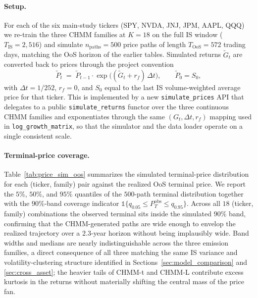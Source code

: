 \paragraph{Setup.}
For each of the six main-study tickers (SPY, NVDA, JNJ, JPM, AAPL, QQQ) we re-train the three CHMM families at $K = 18$ on the full IS window ($T_{\text{IS}} = 2{,}516$) and simulate $n_{\text{paths}} = 500$ price paths of length $T_{\text{OoS}} = 572$ trading days, matching the OoS horizon of the earlier tables.
Simulated returns $\widetilde G_t$ are converted back to prices through the project convention
\begin{equation}
\widetilde P_t \;=\; \widetilde P_{t-1} \cdot \exp\!\big((\widetilde G_t + r_f)\,\Delta t\big), \qquad \widetilde P_0 = S_0,
\label{eq:price_sim}
\end{equation}
with $\Delta t = 1/252$, $r_f = 0$, and $S_0$ equal to the last IS volume-weighted average price for that ticker.
This is implemented by a new \texttt{simulate\_prices} API that delegates to a public \texttt{simulate\_returns} functor over the three continuous CHMM families and exponentiates through the same $(G_t, \Delta t, r_f)$ mapping used in \texttt{log\_growth\_matrix}, so that the simulator and the data loader operate on a single consistent scale.

\paragraph{Terminal-price coverage.}
Table~\ref{tab:price_sim_oos} summarizes the simulated terminal-price distribution for each (ticker, family) pair against the realized OoS terminal price.
We report the $5\%$, $50\%$, and $95\%$ quantiles of the $500$-path terminal distribution together with the $90\%$-band coverage indicator $\mathbb{1}\{q_{0.05} \le P^{\text{obs}}_T \le q_{0.95}\}$.
Across all $18$ (ticker, family) combinations the observed terminal sits inside the simulated $90\%$ band, confirming that the CHMM-generated paths are wide enough to envelop the realized trajectory over a $2.3$-year horizon without being implausibly wide.
Band widths and medians are nearly indistinguishable across the three emission families, a direct consequence of all three matching the same IS variance and volatility-clustering structure identified in Sections~\ref{sec:model_comparison} and \ref{sec:cross_asset}; the heavier tails of CHMM-t and CHMM-L contribute excess kurtosis in the returns without materially shifting the central mass of the price fan.

